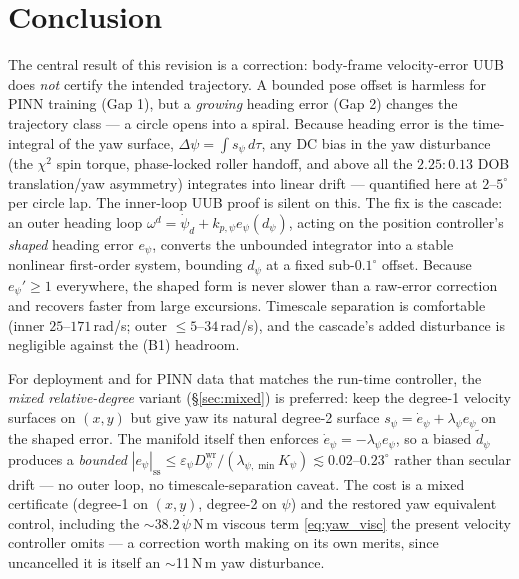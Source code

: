\documentclass[11pt]{article}
\theoremstyle{plain}
\theoremstyle{definition}
\newcommand{\Dwr}{D^{\mathrm{wr}}}
\begin{document}
\section{Conclusion}
The central result of this revision is a correction: body-frame velocity-error UUB does
\emph{not} certify the intended trajectory. A bounded pose offset is harmless for PINN
training (Gap 1), but a \emph{growing} heading error (Gap 2) changes the trajectory
class --- a circle opens into a spiral. Because heading error is the time-integral of
the yaw surface, $\Delta\psi=\int s_\psi\,d\tau$, any DC bias in the yaw disturbance
(the $\chi^2$ spin torque, phase-locked roller handoff, and above all the
$2.25{:}0.13$ DOB translation/yaw asymmetry) integrates into linear drift ---
quantified here at $2$--$5^\circ$ per circle lap. The inner-loop UUB proof is silent on
this. The fix is the cascade: an outer heading loop $\omega^d=\dot\psi_d+k_{p,\psi}
e_\psi(d_\psi)$, acting on the position controller's \emph{shaped} heading error
$e_\psi$, converts the unbounded integrator into a stable nonlinear first-order system,
bounding $d_\psi$ at a fixed sub-$0.1^\circ$ offset. Because $e_\psi'\ge1$ everywhere,
the shaped form is never slower than a raw-error correction and recovers faster from
large excursions. Timescale separation is
comfortable (inner $25$--$171\,$rad/s; outer $\le5$--$34\,$rad/s), and the cascade's
added disturbance is negligible against the (B1) headroom.

For deployment and for PINN data that matches the run-time controller, the
\emph{mixed relative-degree} variant (\S\ref{sec:mixed}) is preferred: keep the
degree-1 velocity surfaces on $(x,y)$ but give yaw its natural degree-2 surface
$s_\psi=\dot e_\psi+\lambda_\psi e_\psi$ on the shaped error. The manifold itself then
enforces $\dot e_\psi=-\lambda_\psi e_\psi$, so a biased $\tilde d_\psi$ produces a
\emph{bounded} $|e_\psi|_{\mathrm{ss}}\le\varepsilon_\psi\Dwr_\psi/(\lambda_{\psi,\min}
K_\psi)\lesssim0.02$--$0.23^\circ$ rather than secular drift --- no outer loop, no
timescale-separation caveat. The cost is a mixed certificate (degree-1 on $(x,y)$,
degree-2 on $\psi$) and the restored yaw equivalent control, including the
$\sim38.2\,\dot\psi\,$N\,m viscous term \eqref{eq:yaw_visc} the present velocity
controller omits --- a correction worth making on its own merits, since uncancelled it
is itself an $\sim$11\,N\,m yaw disturbance.
\end{document}
